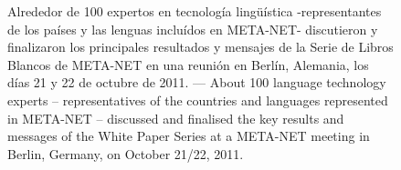 \renewcommand*{\figureformat}{}
\renewcommand*{\captionformat}{}

\begin{figure}[htbp]
  \center
  \caption{Alrededor de 100 expertos en tecnología lingüística -representantes de los países y las lenguas incluídos en META-NET- discutieron y finalizaron los principales resultados y mensajes de la Serie de Libros Blancos de META-NET en una reunión en Berlín, Alemania, los días 21 y 22 de octubre de 2011. --- \textcolor{grey1}{About 100 language technology experts -- representatives of the countries and languages represented in META-NET -- discussed and finalised the key results and messages of the White Paper Series at a META-NET meeting in Berlin, Germany, on October 21/22, 2011.}}
  \medskip
\end{figure}

\cleardoublepage

\label{whitepaperseries}


